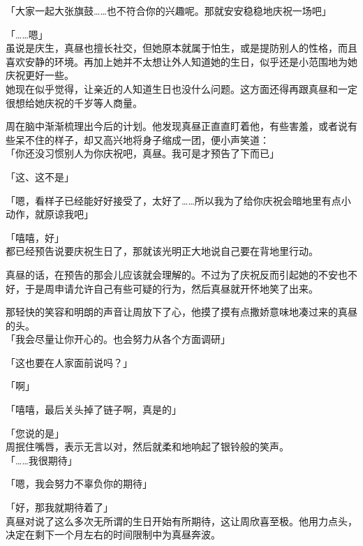 「大家一起大张旗鼓……也不符合你的兴趣呢。那就安安稳稳地庆祝一场吧」

「……嗯」\\

虽说是庆生，真昼也擅长社交，但她原本就属于怕生，或是提防别人的性格，而且喜欢安静的环境。再加上她并不太想让外人知道她的生日，似乎还是小范围地为她庆祝更好一些。\\

她现在似乎觉得，让亲近的人知道生日也没什么问题。这方面还得再跟真昼和一定很想给她庆祝的千岁等人商量。

周在脑中渐渐梳理出今后的计划。他发现真昼正直直盯着他，有些害羞，或者说有些呆不住的样子，却又高兴地将身子缩成一团，便小声笑道：\\

「你还没习惯别人为你庆祝吧，真昼。我可是才预告了下而已」

「这、这不是」

「嗯，看样子已经能好好接受了，太好了……所以我为了给你庆祝会暗地里有点小动作，就原谅我吧」

「嘻嘻，好」\\

都已经预告说要庆祝生日了，那就该光明正大地说自己要在背地里行动。

真昼的话，在预告的那会儿应该就会理解的。不过为了庆祝反而引起她的不安也不好，于是周申请允许自己有些可疑的行为，然后真昼就开怀地笑了出来。

那轻快的笑容和明朗的声音让周放下了心，他摸了摸有点撒娇意味地凑过来的真昼的头。\\

「我会尽量让你开心的。也会努力从各个方面调研」

「这也要在人家面前说吗？」

「啊」

「嘻嘻，最后关头掉了链子啊，真是的」

「您说的是」\\

周抿住嘴唇，表示无言以对，然后就柔和地响起了银铃般的笑声。\\

「……我很期待」

「嗯，我会努力不辜负你的期待」

「好，那我就期待着了」\\

真昼对说了这么多次无所谓的生日开始有所期待，这让周欣喜至极。他用力点头，决定在剩下一个月左右的时间限制中为真昼奔波。
